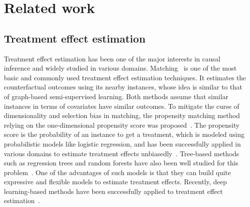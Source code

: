 \section{Related work\label{sec:related}}
\subsection{Treatment effect estimation}
Treatment effect estimation has been one of the major interests in causal inference and widely studied in various domains.
Matching~\cite{rubin1973matching,abadie2006large} is one of the most basic and commonly used treatment effect estimation techniques. 
It estimates the counterfactual outcomes using its nearby instances, whose idea is similar to that of graph-based semi-supervised learning. 
Both methods assume that similar instances in terms of covariates have similar outcomes.   
To mitigate the curse of dimensionality and selection bias in matching, the propensity matching method relying on the one-dimensional propensity score was proposed~\cite{rosenbaum1983central,rosenbaum1985constructing}. 
The propensity score is the probability of an instance to get a  treatment, which is modeled using probabilistic models like logistic regression, and has been successfully applied in various domains to estimate treatment effects unbiasedly~\cite{lunceford2004stratification}. 
Tree-based methods such as regression trees and random forests have also been well studied for this problem~\cite{chipman2010bart,wager2018estimation}.
One of the advantages of such models is that they can build quite expressive and flexible models to estimate treatment effects.
Recently, deep learning-based methods have been successfully applied to treatment effect estimation~\cite{shalit2017estimating,johansson2016learning}. 

